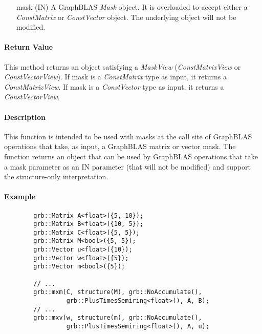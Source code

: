 \begin{itemize}%
    \item[{\sf mask}] ({\sf IN}) A GraphBLAS \emph{Mask} object. It is 
    overloaded to accept either a \emph{ConstMatrix} or \emph{ConstVector} 
    object.  The underlying object will not be modified.
\end{itemize}

\paragraph{Return Value}

This method returns an object satisfying a \emph{MaskView} (\emph{ConstMatrixView} or 
\emph{ConstVectorView}). If {\sf mask} is a \emph{ConstMatrix} type as input, 
it returns a \emph{ConstMatrixView}.  If {\sf mask} is a \emph{ConstVector} 
type as input, it returns a \emph{ConstVectorView}.  

\paragraph{Description}

This function is intended to be used with masks at the call site of GraphBLAS 
operations that take, as input, a GraphBLAS matrix or vector mask.  The function 
returns an object that can be used by GraphBLAS operations that take a mask 
parameter as an {\sf IN} parameter (that will not be modified) and support the 
structure-only interpretation.

\paragraph{Example}

\begin{verbatim}
        grb::Matrix A<float>({5, 10});
        grb::Matrix B<float>({10, 5});
        grb::Matrix C<float>({5, 5});
        grb::Matrix M<bool>({5, 5});
        grb::Vector u<float>({10});
        grb::Vector w<float>({5});
        grb::Vector m<bool>({5});
        
        // ...
        grb::mxm(C, structure(M), grb::NoAccumulate(), 
                 grb::PlusTimesSemiring<float>(), A, B);
        // ...
        grb::mxv(w, structure(m), grb::NoAccumulate(), 
                 grb::PlusTimesSemiring<float>(), A, u);
\end{verbatim}


